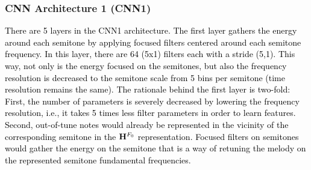 \documentclass{article}
\newcommand{\db}[1]{{\textcolor{black}{#1}}}
\newcommand{\jb}[1]{{\textcolor{black}{#1}}}
\newcommand{\jbcor}[2]{{\textcolor{black}{#2}}}
\begin{document}
\subsubsection{CNN Architecture 1 (CNN1)} \label{subsubsec:CNN1}
\db{There are 5 layers in \jb{the} CNN1 architecture. The first layer gathers the energy around each semitone by applying focused filters centered around each semitone frequency. In this layer, there are 64 (5x1) filters each with a stride (5,1).
\jb{This way, not only is the energy focused on the semitones, but also the frequency resolution is decreased to the semitone scale}
from 5 bins per semitone (time resolution remains the same). The rationale behind the first layer is two-fold: First, the number of parameters is severely decreased by lowering the frequency resolution, i.e., it takes 5 times less filter parameters in order to learn features. Second, out-of-tune notes would already be represented in the vicinity of the corresponding semitone in the $\mathbf{H}^{F_{0}}$ representation. Focused filters on semitones would gather the energy on the semitone that is a way of retuning the melody on the represented semitone fundamental frequencies. }

\end{document}
